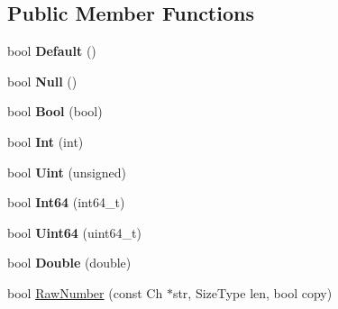 \subsection*{Public Member Functions}
\begin{DoxyCompactItemize}
\item 
bool {\bfseries Default} ()\hypertarget{struct_base_reader_handler_a836437f6ccc37f08ff933f009b18a78c}{}\label{struct_base_reader_handler_a836437f6ccc37f08ff933f009b18a78c}

\item 
bool {\bfseries Null} ()\hypertarget{struct_base_reader_handler_ae2ebbde4628bf3659ddc5d18520935f5}{}\label{struct_base_reader_handler_ae2ebbde4628bf3659ddc5d18520935f5}

\item 
bool {\bfseries Bool} (bool)\hypertarget{struct_base_reader_handler_aa1c3ce42dbb856b3349792dc9d963587}{}\label{struct_base_reader_handler_aa1c3ce42dbb856b3349792dc9d963587}

\item 
bool {\bfseries Int} (int)\hypertarget{struct_base_reader_handler_a85e813aaf7189a2f87bd53953324fafc}{}\label{struct_base_reader_handler_a85e813aaf7189a2f87bd53953324fafc}

\item 
bool {\bfseries Uint} (unsigned)\hypertarget{struct_base_reader_handler_a0e683306cbb7b4e350a35c18c5246f2a}{}\label{struct_base_reader_handler_a0e683306cbb7b4e350a35c18c5246f2a}

\item 
bool {\bfseries Int64} (int64\+\_\+t)\hypertarget{struct_base_reader_handler_a04011733ea584739c97ad5c6afa15a35}{}\label{struct_base_reader_handler_a04011733ea584739c97ad5c6afa15a35}

\item 
bool {\bfseries Uint64} (uint64\+\_\+t)\hypertarget{struct_base_reader_handler_a351aa3cd81856a487c21022e9cc64d2b}{}\label{struct_base_reader_handler_a351aa3cd81856a487c21022e9cc64d2b}

\item 
bool {\bfseries Double} (double)\hypertarget{struct_base_reader_handler_a8156ea6ae5b8cd23a8b700e92a8af1eb}{}\label{struct_base_reader_handler_a8156ea6ae5b8cd23a8b700e92a8af1eb}

\item 
bool \hyperlink{struct_base_reader_handler_a9ed0d83d5e6c8f5e4b32ca3735ff0bb7}{Raw\+Number} (const Ch $\ast$str, Size\+Type len, bool copy)\hypertarget{struct_base_reader_handler_a9ed0d83d5e6c8f5e4b32ca3735ff0bb7}{}\label{struct_base_reader_handler_a9ed0d83d5e6c8f5e4b32ca3735ff0bb7}


\end{DoxyCompactItemize}

